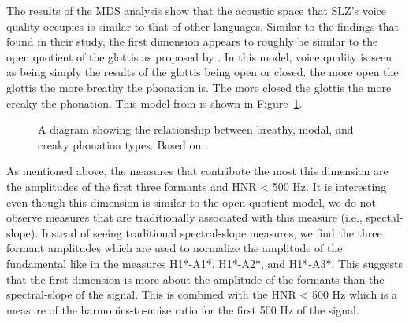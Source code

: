 The results of the MDS analysis show that the acoustic space that SLZ's voice quality occupies is similar to that of other languages. Similar to the findings that \citet{keatingCrosslanguageAcousticSpace2023} found in their study, the first dimension appears to roughly be similar to the open quotient of the glottis as proposed by \citet{gordonPhonationTypesCrosslinguistic2001}. In this model, voice quality is seen as being simply the results of the glottis being open or closed. the more open the glottis the more breathy the phonation is. The more closed the glottis the more creaky the phonation. This model from \citet{gordonPhonationTypesCrosslinguistic2001} is shown in Figure~\ref{fig:phonation_types}. 

\begin{figure}[h!]
    \centering
    \caption{A diagram showing the relationship between breathy, modal, and creaky phonation types. Based on \citet{gordonPhonationTypesCrosslinguistic2001}.}
    \label{fig:phonation_types}
\end{figure}

As mentioned above, the measures that contribute the most this dimension are the amplitudes of the first three formants and HNR < 500 Hz. It is interesting even though this dimension is similar to the open-quotient model, we do not observe measures that are traditionally associated with this measure (i.e., spectal-slope). Instead of seeing traditional spectral-slope measures, we find the three formant amplitudes which are used to normalize the amplitude of the fundamental like in the measures H1*-A1*, H1*-A2*, and H1*-A3*. This suggests that the first dimension is more about the amplitude of the formants than the spectral-slope of the signal. This is combined with the HNR < 500 Hz which is a measure of the harmonics-to-noise ratio for the first 500 Hz of the signal. 

